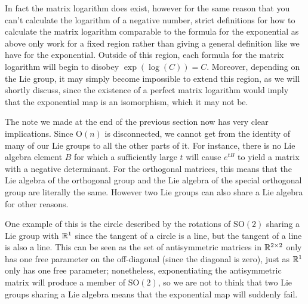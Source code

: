 \documentclass[11pt]{article}
\begin{document}
In fact the matrix logarithm does exist, however for the same reason that you can't calculate the logarithm of a negative number, strict definitions for how to calculate the matrix logarithm comparable to the formula for the exponential as above only work for a fixed region rather than giving a general definition like we have for the exponential. Outside of this region, each formula for the matrix logarithm will begin to disobey $\exp(\log(C))=C$. Moreover, depending on the Lie group, it may simply become impossible to extend this region, as we will shortly discuss, since the existence of a perfect matrix logarithm would imply that the exponential map is an isomorphism, which it may not be.

The note we made at the end of the previous section now has very clear implications. Since $\mathrm{O}(n)$ is disconnected, we cannot get from the identity of many of our Lie groups to all the other parts of it. For instance, there is no Lie algebra element $B$ for which a sufficiently large $t$ will cause $e^{tB}$ to yield a matrix with a negative determinant. For the orthogonal matrices, this means that the Lie algebra of the orthogonal group and the Lie algebra of the special orthogonal group are literally the same. However two Lie groups can also share a Lie algebra for other reasons.

One example of this is the circle described by the rotations of $\mathrm{SO}(2)$ sharing a Lie group with $\mathbb{R}^1$ since the tangent of a circle is a line, but the tangent of a line is also a line. This can be seen as the set of antisymmetric matrices in $\mathbb{R}^{2\times 2}$ only has one free parameter on the off-diagonal (since the diagonal is zero), just as $\mathbb{R}^1$ only has one free parameter; nonetheless, exponentiating the antisymmetric matrix will produce a member of $\mathrm{SO}(2)$, so we are not to think that two Lie groups sharing a Lie algebra means that the exponential map will suddenly fail.
\end{document}
